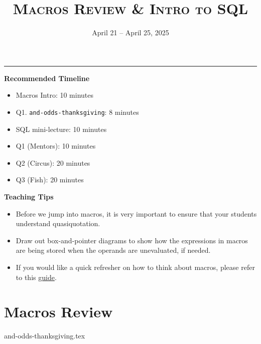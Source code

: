 \documentclass{exam}
\title{\textsc{Macros Review \& Intro to SQL}}
\date{April 21 -- April 25, 2025}
\begin{document}
\maketitle
\rule{\textwidth}{0.15em}

\begin{meta}
\begin{blocksection}
    \textbf{Recommended Timeline}
    \begin{itemize}
        \item Macros Intro: 10 minutes
        \item Q1. \lstinline{and-odds-thanksgiving}: 8 minutes
        \item SQL mini-lecture: 10 minutes
        \item Q1 (Mentors): 10 minutes
        \item Q2 (Circus): 20 minutes
        \item Q3 (Fish): 20 minutes
    \end{itemize}
\end{blocksection}
\vspace{5mm}
\end{meta}

\vspace{3mm}

\begin{meta}
\textbf{Teaching Tips}
\begin{itemize}
    \item Before we jump into macros, it is very important to ensure that your students understand quasiquotation.
    \item Draw out box-and-pointer diagrams to show how the expressions in macros are being stored when the operands are unevaluated, if needed.
    \item If you would like a quick refresher on how to think about macros, please refer to this \href{https://docs.google.com/document/d/1JSbvtJ5bYUEhovDZd_gQnBvkG_WDcafmX-4B3QeIXZU/edit}{guide}.
\end{itemize}
\end{meta}

\vspace{5mm}

\section{Macros Review}
\begin{questions}
{and-odds-thanksgiving.tex}
\end{questions}
\end{document}
